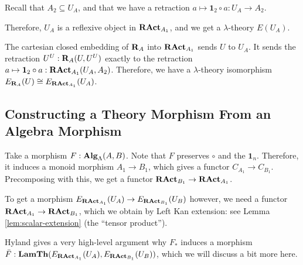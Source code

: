 \begin{definition}\label{def:lambda-algebra-to-lambda-theory}
  Recall that $ A_2 \subseteq U_A $, and that we have a retraction $ a \mapsto \mathbf 1_2 \circ a : U_A \to A_2 $.

  Therefore, $ U_A $ is a reflexive object in $ \mathbf{RAct}_{A_1} $, and we get a $ \lambda $-theory $ E(U_A) $.
\end{definition}

\begin{remark}
  The cartesian closed embedding of $ \mathbf{R}_A $ into $ \mathbf{RAct}_{A_1} $ sends $ U $ to $ U_A $. It sends the retraction $ U^U: \mathbf{R}_A(U, U^U) $ exactly to the retraction $ a \mapsto \mathbf 1_2 \circ a: \mathbf{RAct}_{A_1}(U_A, A_2) $. Therefore, we have a $ \lambda $-theory isomorphism $ E_{\mathbf{R}_A}(U) \cong E_{\mathbf{RAct}_{A_1}}(U_A) $.
\end{remark}

\subsection{Constructing a Theory Morphism From an Algebra Morphism}

Take a morphism $ F: \mathbf{Alg}_{\Lambda}(A, B) $. Note that $ F $ preserves $ \circ $ and the $ \mathbf 1_n $. Therefore, it induces a monoid morphism $ A_1 \to B_1 $, which gives a functor $ C_{A_1} \to C_{B_1} $. Precomposing with this, we get a functor $ \mathbf{RAct}_{B_1} \to \mathbf{RAct}_{A_1} $.

To get a morphism $ E_{\mathbf{RAct}_{A_1}}(U_A) \to E_{\mathbf{RAct}_{B_1}}(U_B) $ however, we need a functor $ \mathbf{RAct}_{A_1} \to \mathbf{RAct}_{B_1} $, which we obtain by Left Kan extension: see Lemma \ref{lem:scalar-extension} (the ``tensor product'').

Hyland gives a very high-level argument why $ F_* $ induces a morphism $ \bar F : \mathbf{LamTh}(E_{\mathbf{RAct}_{A_1}}(U_A), E_{\mathbf{RAct}_{B_1}}(U_B)) $, which we will discuss a bit more here.

